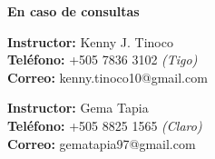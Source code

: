 \vspace*{\fill}
\begin{flushright}
    \textbf{\large En caso de consultas}

    \textbf{Instructor:} Kenny J. Tinoco \\
    \textbf{Teléfono:} +505 7836 3102 \emph{(Tigo)} \\
    \textbf{Correo:} kenny.tinoco10@gmail.com

    \textbf{Instructor:} Gema Tapia\\
    \textbf{Teléfono:} +505 8825 1565 \emph{(Claro)}\\
    \textbf{Correo:} gematapia97@gmail.com

\end{flushright}
\vspace*{0cm}